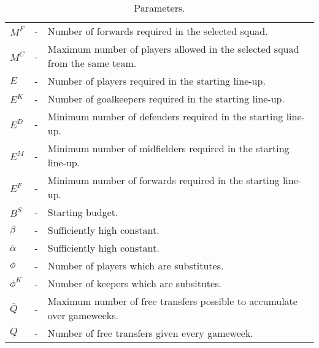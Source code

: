 \begin{table}[H]
{\begin{tabular}{@{}lll@{}}
$M^{F}$                          & - & Number of forwards required in the selected squad.                                              \\
$M^{C}$                          & - & Maximum number of players allowed in the selected squad from the same team.                                         \\
$E$                              & - & Number of players required in the starting line-up.                                               \\
$E^{K}$                          & - & Number of goalkeepers required in the starting line-up.                                           \\
$E^{D}$                          & - & Minimum number of defenders required in the starting line-up.                                     \\
$E^{M}$                          & - & Minimum number of midfielders required in the starting line-up.                                   \\
$E^{F}$                          & - & Minimum number of forwards required in the starting line-up.                                      \\
$B^{S}$                          & - & Starting budget.                                                                               \\
$\beta$                          & - & Sufficiently high constant.                                                                                  \\          
$\bar{\alpha}$                   & - & Sufficiently high constant.                                                                      \\

$\phi$                         & - & Number of players which are substitutes.                                                         \\
$\phi^{K}$                   & - & Number of keepers which are subsitutes.                                                          \\
$\overline{Q}$                   & - & Maximum number of free transfers possible to accumulate over gameweeks.                        \\
$\underline{Q}$                  & - & Number of free transfers given every gameweek.                                                 \\ \bottomrule
\end{tabular}%
}
\caption{Parameters.}
\end{table}


